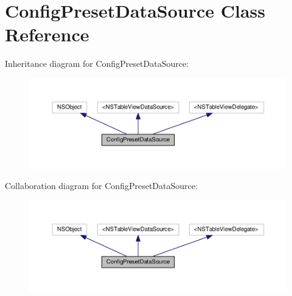 \hypertarget{interfaceConfigPresetDataSource}{}\section{Config\+Preset\+Data\+Source Class Reference}
\label{interfaceConfigPresetDataSource}


Inheritance diagram for Config\+Preset\+Data\+Source\+:
\nopagebreak
\begin{figure}[H]
\begin{center}
\leavevmode
\includegraphics[width=350pt]{interfaceConfigPresetDataSource__inherit__graph}
\end{center}
\end{figure}


Collaboration diagram for Config\+Preset\+Data\+Source\+:
\nopagebreak
\begin{figure}[H]
\begin{center}
\leavevmode
\includegraphics[width=350pt]{interfaceConfigPresetDataSource__coll__graph}
\end{center}
\end{figure}
